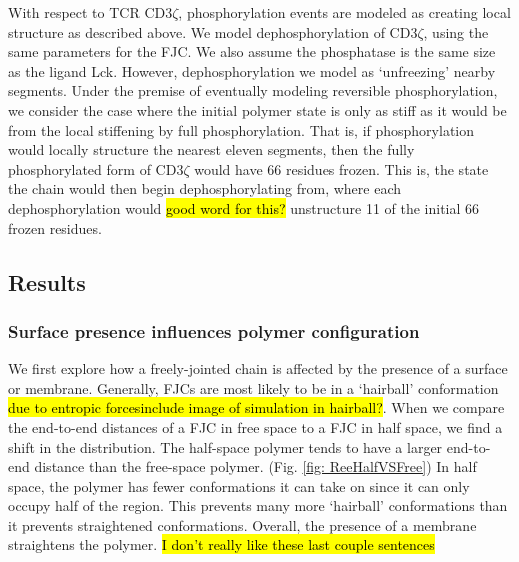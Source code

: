 \documentclass[../../AdvancementSummary.tex]{subfiles}
\begin{document}
With respect to TCR CD3$\zeta$, phosphorylation events are modeled as creating local structure as described above. We model dephosphorylation of CD3$\zeta$, using the same parameters for the FJC. We also assume the phosphatase is the same size as the ligand Lck. However, dephosphorylation we model as `unfreezing' nearby segments. Under the premise of eventually modeling reversible phosphorylation, we consider the case where the initial polymer state is only as stiff as it would be from the local stiffening by full phosphorylation.  That is, if phosphorylation would locally structure the nearest eleven segments, then the fully phosphorylated form of CD3$\zeta$ would have 66 residues frozen. This is, the state the chain would then begin dephosphorylating from, where each dephosphorylation would \hl{good word for this?} unstructure 11 of the initial 66 frozen residues. 


\subsection{Results}

\subsubsection{Surface presence influences polymer configuration}

We first explore how a freely-jointed chain is affected by the presence of a surface or membrane. Generally, FJCs are most likely to be in a `hairball' conformation \hl{due to entropic forces}\hl{include image of simulation in hairball?}. When we compare the end-to-end distances of a FJC in free space to a FJC in half space, we find a shift in the distribution. The half-space polymer tends to have a larger end-to-end distance than the free-space polymer. (Fig. \ref{fig: ReeHalfVSFree}) In half space, the polymer has fewer conformations it can take on since it can only occupy half of the region. This prevents many more `hairball' conformations than it prevents straightened conformations.  Overall, the presence of a membrane straightens the polymer. \hl{I don't really like these last couple sentences}
\end{document}
